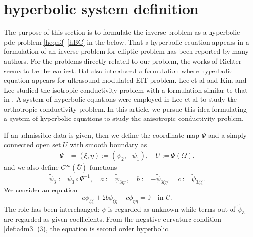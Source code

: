 \documentclass[11pt]{amsart}
\theoremstyle{plain}
\theoremstyle{remark}
\numberwithin{equation}{section}
\numberwithin{Thm}{section}
\begin{document}
\section{hyperbolic system definition} \label{sec:hprob}
The purpose of this section is to formulate the inverse problem as a hyperbolic pde problem \eqref{heqn3}-\eqref{hBC} in the below. That a hyperbolic equation appears in a formulation of an inverse problem for elliptic problem has been reported by many authors. For the problems directly related to our problem, the works of Richter \cite{richter_inverse_1981, richter_numerical_1981} seems to be the earliest. Bal \cite{bal_2013} also introduced a formulation where hyperbolic equation appears for ultrasound modulated EIT problem. Lee et al \cite{lee_virtual_2014} and Kim and Lee \cite{lee_well-posedness_2015} studied the isotropic conductivity problem with a formulation similar to that in \cite{richter_inverse_1981, richter_numerical_1981}. A system of hyperbolic equations were employed in Lee et al \cite{lee_orthotropic_2015} to study the orthotropic conductivity problem. In this article, we pursue this idea formulating  a system of hyperbolic equations to study the anisotropic conductivity problem.


If an admissible data is given, then we define the coordinate map $\Psi$ and a simply connected open set $U$ with smooth boundary as 
\begin{align} \label{maps}
 \Psi&=(\xi,\eta):=(\psi_2,-\psi_1), \quad U:=\Psi(\Omega).
\end{align}
and we also define $C^\infty(\bar U)$ functions
\begin{equation} \label{coeff}
 \tilde\psi _3:= \psi_3\circ\Psi^{-1}, \quad a := \tilde\psi _ {3\eta\eta}, \quad b :=- \tilde\psi _ {3\xi\eta}, \quad c := \tilde\psi _ {3\xi\xi}.
\end{equation}
We consider an equation 
\begin{equation} \label{heqn}
 a\phi_{\xi\xi} + 2b\phi_{\xi\eta} + c \phi_{\eta\eta} = 0 \quad \text{in $U$}.
\end{equation}
The role has been interchanged: $\phi$ is regarded as unknown while terms out of $\tilde\psi _3$ are regarded as given coefficients. From the negative curvature condition \ref{def:adm3} (3), the equation is second order hyperbolic. %
\end{document}
